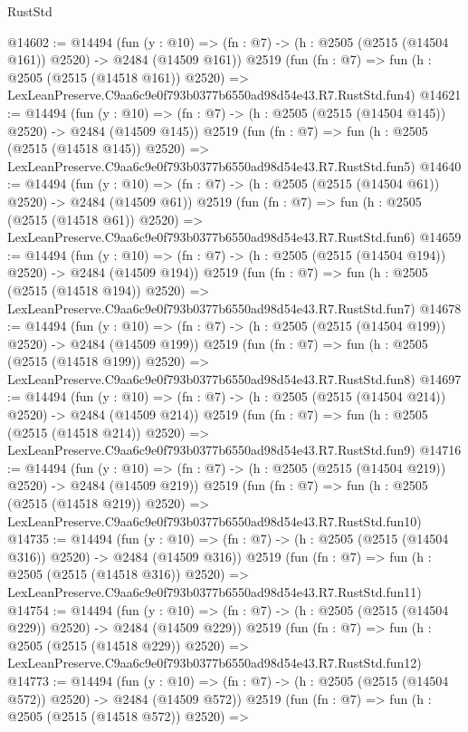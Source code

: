 \begin{lexlean}{RustStd}
\begin{coremodule}
@14602 := @14494
    (fun (y : @10) => (fn : @7) -> (h : @2505 (@2515 (@14504 @161)) @2520) -> @2484 (@14509 @161))
    @2519
    (fun (fn : @7) =>
    fun (h : @2505 (@2515 (@14518 @161)) @2520) =>
    LexLeanPreserve.C9aa6c9e0f793b0377b6550ad98d54e43.R7.RustStd.fun4)
@14621 := @14494
    (fun (y : @10) => (fn : @7) -> (h : @2505 (@2515 (@14504 @145)) @2520) -> @2484 (@14509 @145))
    @2519
    (fun (fn : @7) =>
    fun (h : @2505 (@2515 (@14518 @145)) @2520) =>
    LexLeanPreserve.C9aa6c9e0f793b0377b6550ad98d54e43.R7.RustStd.fun5)
@14640 := @14494
    (fun (y : @10) => (fn : @7) -> (h : @2505 (@2515 (@14504 @61)) @2520) -> @2484 (@14509 @61))
    @2519
    (fun (fn : @7) =>
    fun (h : @2505 (@2515 (@14518 @61)) @2520) =>
    LexLeanPreserve.C9aa6c9e0f793b0377b6550ad98d54e43.R7.RustStd.fun6)
@14659 := @14494
    (fun (y : @10) => (fn : @7) -> (h : @2505 (@2515 (@14504 @194)) @2520) -> @2484 (@14509 @194))
    @2519
    (fun (fn : @7) =>
    fun (h : @2505 (@2515 (@14518 @194)) @2520) =>
    LexLeanPreserve.C9aa6c9e0f793b0377b6550ad98d54e43.R7.RustStd.fun7)
@14678 := @14494
    (fun (y : @10) => (fn : @7) -> (h : @2505 (@2515 (@14504 @199)) @2520) -> @2484 (@14509 @199))
    @2519
    (fun (fn : @7) =>
    fun (h : @2505 (@2515 (@14518 @199)) @2520) =>
    LexLeanPreserve.C9aa6c9e0f793b0377b6550ad98d54e43.R7.RustStd.fun8)
@14697 := @14494
    (fun (y : @10) => (fn : @7) -> (h : @2505 (@2515 (@14504 @214)) @2520) -> @2484 (@14509 @214))
    @2519
    (fun (fn : @7) =>
    fun (h : @2505 (@2515 (@14518 @214)) @2520) =>
    LexLeanPreserve.C9aa6c9e0f793b0377b6550ad98d54e43.R7.RustStd.fun9)
@14716 := @14494
    (fun (y : @10) => (fn : @7) -> (h : @2505 (@2515 (@14504 @219)) @2520) -> @2484 (@14509 @219))
    @2519
    (fun (fn : @7) =>
    fun (h : @2505 (@2515 (@14518 @219)) @2520) =>
    LexLeanPreserve.C9aa6c9e0f793b0377b6550ad98d54e43.R7.RustStd.fun10)
@14735 := @14494
    (fun (y : @10) => (fn : @7) -> (h : @2505 (@2515 (@14504 @316)) @2520) -> @2484 (@14509 @316))
    @2519
    (fun (fn : @7) =>
    fun (h : @2505 (@2515 (@14518 @316)) @2520) =>
    LexLeanPreserve.C9aa6c9e0f793b0377b6550ad98d54e43.R7.RustStd.fun11)
@14754 := @14494
    (fun (y : @10) => (fn : @7) -> (h : @2505 (@2515 (@14504 @229)) @2520) -> @2484 (@14509 @229))
    @2519
    (fun (fn : @7) =>
    fun (h : @2505 (@2515 (@14518 @229)) @2520) =>
    LexLeanPreserve.C9aa6c9e0f793b0377b6550ad98d54e43.R7.RustStd.fun12)
@14773 := @14494
    (fun (y : @10) => (fn : @7) -> (h : @2505 (@2515 (@14504 @572)) @2520) -> @2484 (@14509 @572))
    @2519
    (fun (fn : @7) =>
    fun (h : @2505 (@2515 (@14518 @572)) @2520) =>

\end{coremodule}
\end{lexlean}
